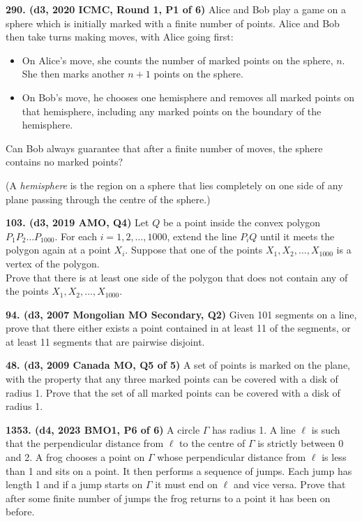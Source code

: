 \documentclass{article}
\begin{document}
\textbf{290. (\color{red}d3\color{black}, 2020 ICMC, Round 1, P1 of 6)} Alice and Bob play a game on a sphere which is initially marked with a finite number of points. Alice and Bob then take turns making moves, with Alice going first:

\begin{itemize}

\item On Alice's move, she counts the number of marked points on the sphere, $ n $. She then marks another $ n + 1 $ points on the sphere.

\item On Bob's move, he chooses one hemisphere and removes all marked points on that hemisphere, including any marked points on the boundary of the hemisphere.

\end{itemize}

Can Bob always guarantee that after a finite number of moves, the sphere contains no marked points?



(A \emph{hemisphere} is the region on a sphere that lies completely on one side of any plane passing through the centre of the sphere.)

\textbf{103. (\color{red}d3\color{black}, 2019 AMO, Q4)} Let \(Q\) be a point inside the convex polygon \(P_1 P_2 \dots P_{1000}\). For each \(i=1, 2, \dots, 1000\), extend the line \(P_i Q\) until it meets the polygon again at a point \(X_i\). Suppose that one of the points \(X_1, X_2, \dots, X_{1000}\) is a vertex of the polygon.\\
\makebox[16pt]{}Prove that there is at least one side of the polygon that does not contain any of the points \(X_1, X_2, \dots, X_{1000}\).

\textbf{94. (\color{red}d3\color{black}, 2007 Mongolian MO Secondary, Q2)} Given 101 segments on a line, prove that there either exists a point contained in at least 11 of the segments, or at least 11 segments that are pairwise disjoint.

\textbf{48. (\color{red}d3\color{black}, 2009 Canada MO, Q5 of 5)} A set of points is marked on the plane, with the property that any three marked points can be covered with a disk of radius 1. Prove that the set of all marked points can be covered with a disk of radius 1.

\textbf{1353. (\color{red}d4\color{black}, 2023 BMO1, P6 of 6)} A circle $\Gamma$ has radius 1. A line $\ell$ is such that the perpendicular distance from $\ell$ to the centre of $\Gamma$ is strictly between 0 and 2. A frog chooses a point on $\Gamma$ whose perpendicular distance from $\ell$ is less than 1 and sits on a point. It then performs a sequence of jumps. Each jump has length 1 and if a jump starts on $\Gamma$ it must end on $\ell$ and vice versa. Prove that after some finite number of jumps the frog returns to a point it has been on before.
\end{document}
